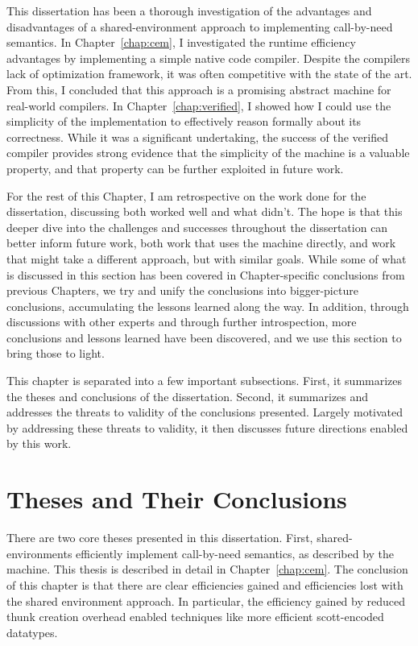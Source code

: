 This dissertation has been a thorough investigation of the advantages and
disadvantages of a shared-environment approach to implementing call-by-need
semantics. In Chapter~\ref{chap:cem}, I investigated the runtime efficiency
advantages by implementing a simple native code compiler. Despite the compilers
lack of optimization framework, it was often competitive with the state of the
art. From this, I concluded that this approach is a promising abstract machine 
for real-world compilers. In Chapter~\ref{chap:verified}, I showed how I could
use the simplicity of the implementation to effectively reason formally about
its correctness. While it was a significant undertaking, the success of the
verified compiler provides strong evidence that the simplicity of the machine is
a valuable property, and that property can be further exploited in future work.

For the rest of this Chapter, I am retrospective on the work done for the
dissertation, discussing both worked well and what didn't. The hope is that this
deeper dive into the challenges and successes throughout the dissertation can
better inform future work, both work that uses the \ce machine directly, and
work that might take a different approach, but with similar goals. While some of
what is discussed in this section has been covered in Chapter-specific
conclusions from previous Chapters, we try and unify the conclusions into
bigger-picture conclusions, accumulating the lessons learned along the way. In
addition, through discussions with other experts and through further
introspection, more conclusions and lessons learned have been discovered, and we
use this section to bring those to light. 

This chapter is separated into a few important subsections. First, it summarizes
the theses and conclusions of the dissertation. Second, it summarizes and
addresses the threats to validity of the conclusions presented. Largely
motivated by addressing these threats to validity, it then discusses future
directions enabled by this work. 

\section{Theses and Their Conclusions}

There are two core theses presented in this dissertation. First,
shared-environments efficiently implement call-by-need semantics, as described
by the \ce machine. This thesis is described in detail in
Chapter~\ref{chap:cem}. The conclusion of this chapter is that there are clear
efficiencies gained and efficiencies lost with the shared environment approach.
In particular, the efficiency gained by reduced thunk creation overhead enabled
techniques like more efficient scott-encoded datatypes. 

